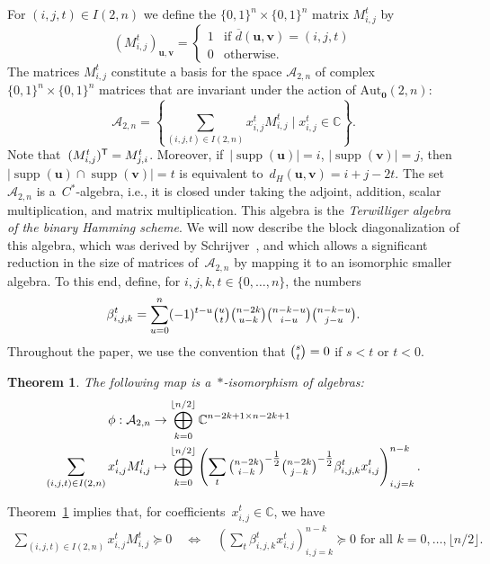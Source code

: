 \documentclass[10pt,a4paper]{article}
\newcommand{\C}{\mathbb{C}}
\newtheorem{theorem}{Theorem}[section]
\theoremstyle{definition}
\newcommand{\uu}{\mathbf{u}}
\newcommand{\vv}{\mathbf{v}}
\newcommand{\zero}{\mathbf{0}}
\newcommand{\AutZ}{\mathrm{Aut}_{\zero}}
\DeclareMathOperator*{\supp}{supp}
\begin{document}
For $(i,j,t)\in I(2,n)$ we define the $\{0,1\}^n\times\{0,1\}^n$ matrix $M_{i,j}^{t}$ by 
\[
\left(M_{i,j}^{t}\right)_{\uu,\vv}=
\begin{cases}
1& \text{if }\overline{d}(\uu,\vv)=(i,j,t)\\
0& \text{otherwise.}
\end{cases}
\]
The matrices $M_{i,j}^{t}$ constitute a basis for the space $\mathcal{A}_{2,n}$ of complex $\{0,1\}^n\times \{0,1\}^n$ matrices that are invariant under the action of $\AutZ(2,n)$: 
\[
\mathcal{A}_{2,n}=\left\{\sum_{(i,j,t)\in I(2,n)}x_{i,j}^{t}M_{i,j}^{t}\mid x_{i,j}^{t}\in \C\right\}.
\]
Note that~$(M_{i,j}^t)^{\sf T} = M_{j,i}^t$. Moreover, if~$|\supp(\uu)|=i$, $|\supp(\vv)|=j$, then~$|\supp(\uu) \cap \supp(\vv)|=t$ is equivalent to~$d_H(\uu,\vv)=i+j-2t$. The set~$\mathcal{A}_{2,n}$ is a~$C^*$-algebra, i.e., it is closed under taking the adjoint, addition, scalar multiplication, and matrix multiplication. This algebra is the \emph{Terwilliger algebra of the binary Hamming scheme}. We will now describe the block diagonalization of this algebra, which was derived by Schrijver~\cite{Sch05}, and which allows a significant reduction in the size of matrices of~$\mathcal{A}_{2,n}$ by mapping it to an isomorphic smaller algebra. To this end, define, for $i,j,k,t \in \{0,\ldots, n \}$, the numbers
\begin{align}
\beta_{i,j,k}^{t}=\sum_{u=0}^n (-1)^{t-u} \tbinom{u}{t}\tbinom{n-2k}{u-k}\tbinom{n-k-u}{i-u}\tbinom{n-k-u}{j-u}.
\end{align}
Throughout the paper, we use the convention that $\tbinom{s}{t}=0$ if $s<t$ or $t<0$.
\begin{theorem}{\cite{Sch05}} \label{thm:blockhammingcube}
The following map is a~$*$-isomorphism of algebras: 
\begin{align}
\phi: \mathcal{A}_{2,n} &\to\bigoplus_{k=0}^{\lfloor n/2 \rfloor} \mathbb{C}^{n-2k+1 \times n-2k+1}  \notag \\
\sum_{(i,j,t)\in I(2,n)} x_{i,j}^t M_{i,j}^t &\mapsto \bigoplus_{k=0}^{\lfloor n/2 \rfloor} \left( \sum_{t} \tbinom{n-2k}{i-k}^{-\tfrac{1}{2}} \tbinom{n-2k}{j-k}^{-\tfrac{1}{2}} \beta_{i,j,k}^{t} x_{i,j}^t \right)_{i,j=k}^{n-k}. \label{eq:stariso}
\end{align}
\end{theorem}
Theorem~\ref{thm:blockhammingcube} implies that, for coefficients~$x_{i,j}^t \in \mathbb{C}$, we have
\begin{align}\label{eq:Mprimesymmetryreduction}
\sum_{(i,j,t)\in I(2,n)} x_{i,j}^t M_{i,j}^t \succeq 0  \quad \Longleftrightarrow  \quad \left( \sum_{t} \beta_{i,j,k}^{t} x_{i,j}^t \right)_{i,j=k}^{n-k} \succeq 0 \text{ for all $k=0,\ldots, {\lfloor n/2 \rfloor}$.} 
\end{align}
\end{document}
